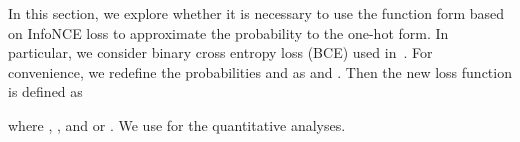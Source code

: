 \begin{table}

\centering
{}
\vspace{0.3 mm}
\caption{Comparison of different FCL improvement methods on DomainNet under the setting of -shot and Resnet34.}
\label{tab:SFCL_BCE}
\end{table}

In this section, we explore whether it is necessary to use the function form based on InfoNCE loss to approximate the probability to the one-hot form. In particular, we consider binary cross entropy loss (BCE) used in~\cite{zhong2021neighborhood}. For convenience, we redefine the probabilities  and  as  and .
Then the new loss function is defined as
\begin{small}

\end{small}where ,  , and  or . We use  for the quantitative analyses.

